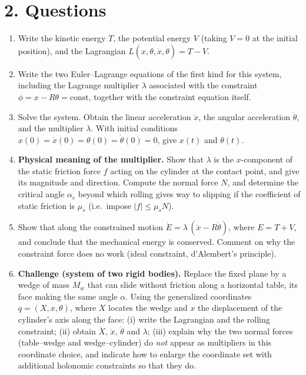 \documentclass[11pt]{article}
\begin{document}
\section*{2. Questions}

\begin{enumerate}[label=(\alph*), leftmargin=*]
  \item Write the kinetic energy $T$, the potential energy $V$ (taking $V=0$ at
        the initial position), and the Lagrangian
        $L(x,\theta,\dot x,\dot\theta)=T-V$.

  \item Write the two Euler--Lagrange equations of the first kind for this
        system, including the Lagrange multiplier $\lambda$ associated with the
        constraint $\phi = x - R\theta = \text{const}$, together with the
        constraint equation itself.

  \item Solve the system. Obtain the linear acceleration $\ddot x$, the angular
        acceleration $\ddot\theta$, and the multiplier $\lambda$. With initial
        conditions $x(0)=\dot x(0)=\theta(0)=\dot\theta(0)=0$, give
        $x(t)$ and $\theta(t)$.

  \item \textbf{Physical meaning of the multiplier.} Show that $\lambda$ is the
        $x$-component of the static friction force $f$ acting on the cylinder at
        the contact point, and give its magnitude and direction. Compute the
        normal force $N$, and determine the critical angle $\alpha_c$ beyond
        which rolling gives way to slipping if the coefficient of static
        friction is $\mu_s$ (i.e.\ impose $|f| \le \mu_s N$).

  \item Show that along the constrained motion
        $\dot E = \lambda\,(\dot x - R\dot\theta)$, where
        $E = T+V$, and conclude that the mechanical energy is conserved.
        Comment on why the constraint force does no work (ideal constraint,
        d'Alembert's principle).

  \item \textbf{Challenge (system of two rigid bodies).} Replace the fixed
        plane by a wedge of mass $M_w$ that can slide without friction along a
        horizontal table, its face making the same angle $\alpha$. Using the
        generalized coordinates $q = (X, x, \theta)$, where $X$ locates the
        wedge and $x$ the displacement of the cylinder's axis along the face:
        (i) write the Lagrangian and the rolling constraint;
        (ii) obtain $\ddot X$, $\ddot x$, $\ddot\theta$ and $\lambda$;
        (iii) explain why the two normal forces (table--wedge and
        wedge--cylinder) do \emph{not} appear as multipliers in this coordinate
        choice, and indicate how to enlarge the coordinate set with additional
        holonomic constraints so that they do.
\end{enumerate}
\end{document}
